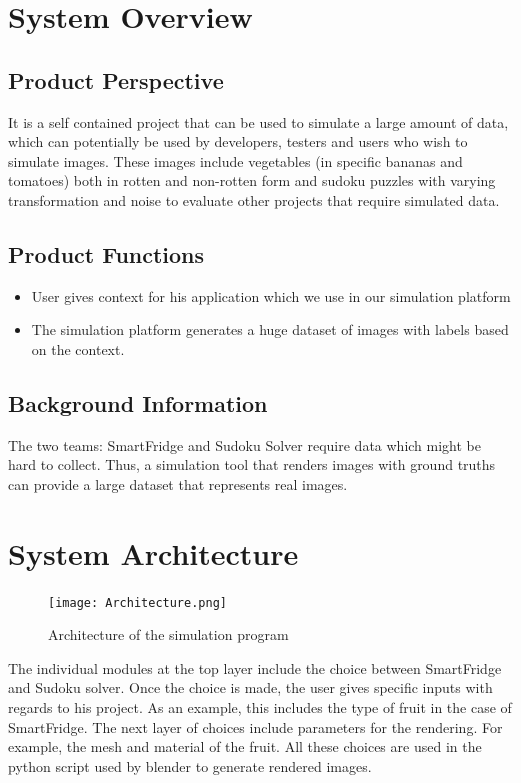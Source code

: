 \documentclass[a4paper,12pt]{article}
\begin{document}
\newpage
\section{System Overview}
\subsection{Product Perspective}
It is a self contained project that can be used to simulate a large amount of data, which can potentially be used by developers, testers and users who wish to simulate images. These images include vegetables (in specific bananas and tomatoes) both in rotten and non-rotten form and sudoku puzzles with varying transformation and noise to evaluate other projects that require simulated data.

\subsection{Product Functions}
\begin{itemize}
\item User gives context for his application which we use in our simulation platform
\item The simulation platform generates a huge dataset of images with labels based on the context.
\end{itemize}
\subsection{Background Information}
The two teams: SmartFridge and Sudoku Solver require data which might be hard to collect. Thus, a simulation tool that renders images with ground truths can provide a large dataset that represents real images.
\section{System Architecture}
\begin{figure}[H]
\texttt{[image: Architecture.png]}
\caption{Architecture of the simulation program}
\end{figure}
The individual modules at the top layer include the choice between SmartFridge and Sudoku solver. Once the choice is made, the user gives specific inputs with regards to his project. As an example, this includes the type of fruit in the case of SmartFridge. The next layer of choices include parameters for the rendering. For example, the mesh and material of the fruit. All these choices are used in the python script used by blender to generate rendered images.
\end{document}
